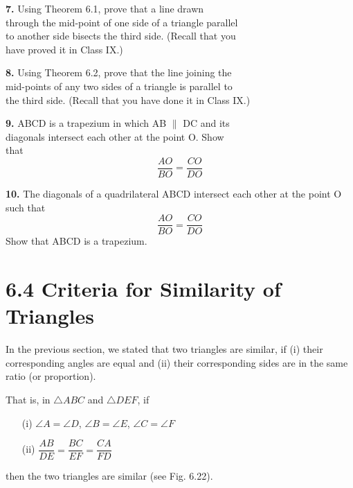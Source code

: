 \documentclass[a4paper,12pt]{article}
\begin{document}
\vspace{-17em}

\textbf{7.} Using Theorem 6.1, prove that a line drawn\\ through  
the mid-point of one side of a triangle parallel\\ to another side  
bisects the third side. (Recall that you\\ have proved it in Class IX.)

\vspace{1em}

\textbf{8.} Using Theorem 6.2, prove that the line joining the \\ 
mid-points of any two sides of a triangle is parallel to  \\
the third side. (Recall that you have done it in Class IX.)

\vspace{1em}

\textbf{9.} ABCD is a trapezium in which AB $\parallel$ DC and its  \\
diagonals intersect each other at the point O. Show\\ that  
\[
\frac{AO}{BO} = \frac{CO}{DO}
\]

\vspace{1em}

\textbf{10.} The diagonals of a quadrilateral ABCD intersect each  
other at the point O such that  
\[
\frac{AO}{BO} = \frac{CO}{DO}
\]
Show that ABCD is a trapezium.

\vspace{-1em}

\section*{6.4 \hspace{0.5em} Criteria for Similarity of Triangles}

In the previous section, we stated that two triangles are similar,  
if (i) their corresponding angles are equal and  
(ii) their corresponding sides are in the same ratio (or proportion).

That is, in $\triangle ABC$ and $\triangle DEF$, if
\begin{itemize}
  \item[(i)] $\angle A = \angle D$, $\angle B = \angle E$, $\angle C = \angle F$
  \item[(ii)] $\dfrac{AB}{DE} = \dfrac{BC}{EF} = \dfrac{CA}{FD}$
\end{itemize}
then the two triangles are similar (see Fig. 6.22).
\end{document}
